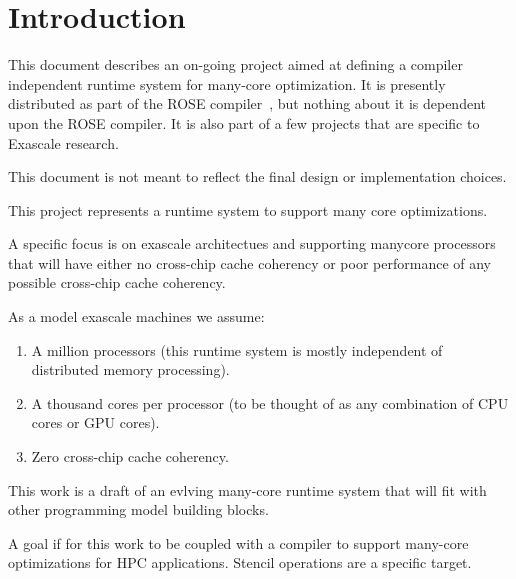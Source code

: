 \section{Introduction}
This document describes an on-going project aimed at defining a compiler independent
runtime system for many-core optimization.  It is presently distributed as 
part of the ROSE compiler~\cite{roseWeb2008}, but nothing about it is dependent 
upon the ROSE compiler. It is also part of a few projects that are specific to 
Exascale research.

This document is not meant to reflect the final design or implementation choices. 


This project represents a runtime system to support many core optimizations.

A specific focus is on exascale architectues and supporting manycore
processors that will have either no cross-chip cache coherency or 
poor performance of any possible cross-chip cache coherency.

As a model exascale machines we assume:
\begin{enumerate}
   \item A million processors (this runtime system is mostly independent of distributed
      memory processing).

   \item A thousand cores per processor (to be thought of as any combination of CPU cores
    or GPU cores).

   \item Zero cross-chip cache coherency.
\end{enumerate}


This work is a draft of an evlving many-core runtime system that will fit with 
other programming model building blocks.


A goal if for this work to be coupled with a compiler to support many-core
optimizations for HPC applications.  Stencil operations are a specific target.
